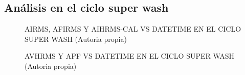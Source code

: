 \subsection{Análisis en el ciclo super wash}
\begin{figure}[H]
  \hfill
  \hfill
  \hfill
  \caption{AIRMS, AFIRMS Y AIHRMS-CAL VS DATETIME EN EL CICLO SUPER WASH (Autoria propia)}
  \end{figure}
\begin{figure}[H]
  \hfill
  \hfill
  \hfill
  \caption{AVHRMS Y APF VS DATETIME EN EL CICLO SUPER WASH (Autoria propia)}
  \end{figure}
